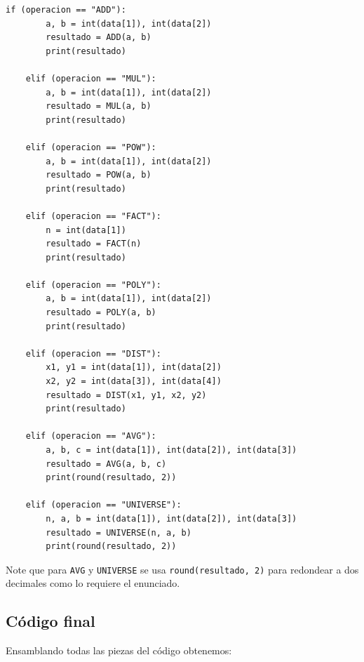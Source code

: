 \documentclass{article}
\begin{document}
\begin{lstlisting}[style=pythonstyle]
    if (operacion == "ADD"):
        a, b = int(data[1]), int(data[2])
        resultado = ADD(a, b)
        print(resultado)
        
    elif (operacion == "MUL"):
        a, b = int(data[1]), int(data[2])
        resultado = MUL(a, b)
        print(resultado)
        
    elif (operacion == "POW"):
        a, b = int(data[1]), int(data[2])
        resultado = POW(a, b)
        print(resultado)
        
    elif (operacion == "FACT"):
        n = int(data[1])
        resultado = FACT(n)
        print(resultado)
        
    elif (operacion == "POLY"):
        a, b = int(data[1]), int(data[2])
        resultado = POLY(a, b)
        print(resultado)
        
    elif (operacion == "DIST"):
        x1, y1 = int(data[1]), int(data[2])
        x2, y2 = int(data[3]), int(data[4])
        resultado = DIST(x1, y1, x2, y2)
        print(resultado)
        
    elif (operacion == "AVG"):
        a, b, c = int(data[1]), int(data[2]), int(data[3])
        resultado = AVG(a, b, c)
        print(round(resultado, 2))
        
    elif (operacion == "UNIVERSE"):
        n, a, b = int(data[1]), int(data[2]), int(data[3])
        resultado = UNIVERSE(n, a, b)
        print(round(resultado, 2))
\end{lstlisting}

Note que para \texttt{AVG} y \texttt{UNIVERSE} se usa \lstinline[style=pythonstyle]|round(resultado, 2)| para redondear a dos decimales como lo requiere el enunciado.

\subsection{Código final}

Ensamblando todas las piezas del código obtenemos:
\end{document}
